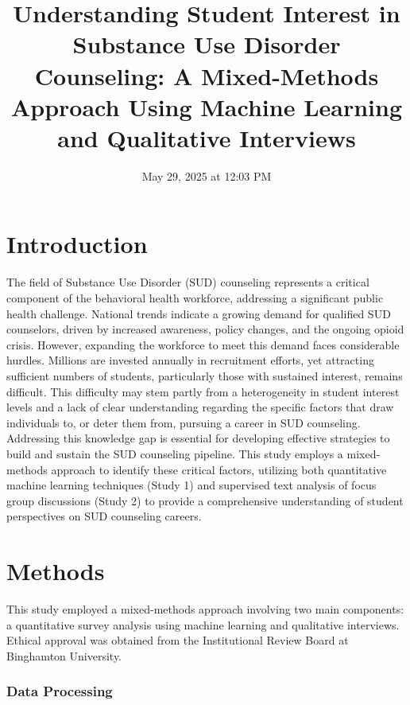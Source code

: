 \documentclass[
  man,
  longtable,
  nolmodern,
  notxfonts,
  notimes,
  colorlinks=true,linkcolor=blue,citecolor=blue,urlcolor=blue]{apa7}
\title{Understanding Student Interest in Substance Use Disorder
Counseling: A Mixed-Methods Approach Using Machine Learning and
Qualitative Interviews}
\affiliation{
{Binghamton University}}
\date{May 29, 2025 at 12:03 PM}
\begin{document}
\maketitle


\setcounter{secnumdepth}{-\maxdimen} %

\setlength\LTleft{0pt}


\section{Introduction}\label{introduction}

The field of Substance Use Disorder (SUD) counseling represents a
critical component of the behavioral health workforce, addressing a
significant public health challenge. National trends indicate a growing
demand for qualified SUD counselors, driven by increased awareness,
policy changes, and the ongoing opioid crisis. However, expanding the
workforce to meet this demand faces considerable hurdles. Millions are
invested annually in recruitment efforts, yet attracting sufficient
numbers of students, particularly those with sustained interest, remains
difficult. This difficulty may stem partly from a heterogeneity in
student interest levels and a lack of clear understanding regarding the
specific factors that draw individuals to, or deter them from, pursuing
a career in SUD counseling. Addressing this knowledge gap is essential
for developing effective strategies to build and sustain the SUD
counseling pipeline. This study employs a mixed-methods approach to
identify these critical factors, utilizing both quantitative machine
learning techniques (Study 1) and supervised text analysis of focus
group discussions (Study 2) to provide a comprehensive understanding of
student perspectives on SUD counseling careers.

\section{Methods}\label{methods}

This study employed a mixed-methods approach involving two main
components: a quantitative survey analysis using machine learning and
qualitative interviews. Ethical approval was obtained from the
Institutional Review Board at Binghamton University.

\subsubsection{Data Processing}\label{data-processing}
\end{document}
